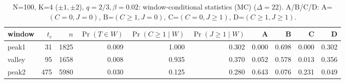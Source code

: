 \begin{table}[!htbp]
\centering
\scriptsize
\setlength{\tabcolsep}{4pt}
\begin{tabular}{lrrrrrrrrr}
\toprule
window & $t_c$ & $n$ & $\Pr(T\in W)$ & $\Pr(C\ge 1\mid W)$ & $\Pr(J\ge 1\mid W)$ & A & B & C & D\\
\midrule
peak1 & 31 & 1825 & 0.009 & 1.000 & 0.302 & 0.000 & 0.698 & 0.000 & 0.302\\
valley & 95 & 1658 & 0.008 & 0.935 & 0.370 & 0.052 & 0.578 & 0.013 & 0.356\\
peak2 & 475 & 5980 & 0.030 & 0.125 & 0.280 & 0.643 & 0.076 & 0.231 & 0.049\\
\bottomrule
\end{tabular}
\caption{N=100, K=4 ($\pm1,\pm2$), $q=2/3,\beta=0.02$: window-conditional statistics (MC) ($\Delta=22$). A/B/C/D: A=$(C=0,J=0)$, B=$(C\ge 1,J=0)$, C=$(C=0,J\ge 1)$, D=$(C\ge 1,J\ge 1)$.}
\label{tab:case-window-N100-K4-beta002-en}
\end{table}
